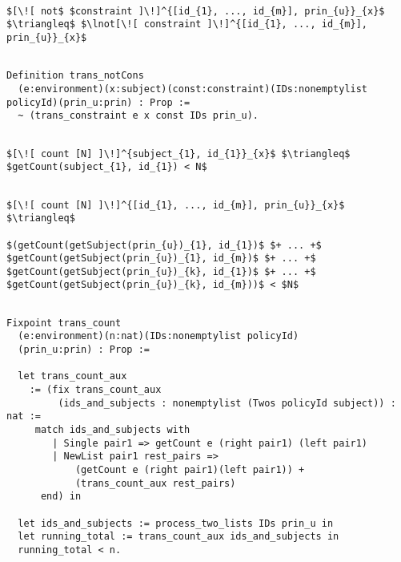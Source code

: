 \lstset{mathescape, language=AST}  
\begin{lstlisting}[frame=single, caption={Not Constraint Translation},label={lst:transnotCons}]

$[\![ not$ $constraint ]\!]^{[id_{1}, ..., id_{m}], prin_{u}}_{x}$ $\triangleq$ $\lnot[\![ constraint ]\!]^{[id_{1}, ..., id_{m}], prin_{u}}_{x}$ 

\end{lstlisting}

\begin{lstlisting}

Definition trans_notCons
  (e:environment)(x:subject)(const:constraint)(IDs:nonemptylist policyId)(prin_u:prin) : Prop :=
  ~ (trans_constraint e x const IDs prin_u).
\end{lstlisting}



\lstset{mathescape, language=AST}  
\begin{lstlisting}[frame=single, caption={Count Translation {$\colon$} subject and policyId pair},label={lst:transcountSinglePair}]

$[\![ count [N] ]\!]^{subject_{1}, id_{1}}_{x}$ $\triangleq$ $getCount(subject_{1}, id_{1}) < N$
\end{lstlisting}

\lstset{mathescape, language=AST}  
\begin{lstlisting}[frame=single, caption={Count Translation {$\colon$} subject and policyId pairs},label={lst:transcountPairs}]

$[\![ count [N] ]\!]^{[id_{1}, ..., id_{m}], prin_{u}}_{x}$ $\triangleq$ 

$(getCount(getSubject(prin_{u})_{1}, id_{1})$ $+ ... +$ $getCount(getSubject(prin_{u})_{1}, id_{m})$ $+ ... +$ $getCount(getSubject(prin_{u})_{k}, id_{1})$ $+ ... +$ $getCount(getSubject(prin_{u})_{k}, id_{m}))$ < $N$


\end{lstlisting}




\begin{lstlisting}
Fixpoint trans_count 
  (e:environment)(n:nat)(IDs:nonemptylist policyId)
  (prin_u:prin) : Prop := 

  let trans_count_aux 
    := (fix trans_count_aux
         (ids_and_subjects : nonemptylist (Twos policyId subject)) : nat :=
     match ids_and_subjects with
        | Single pair1 => getCount e (right pair1) (left pair1)
        | NewList pair1 rest_pairs =>
            (getCount e (right pair1)(left pair1)) +
            (trans_count_aux rest_pairs)
      end) in
  
  let ids_and_subjects := process_two_lists IDs prin_u in
  let running_total := trans_count_aux ids_and_subjects in
  running_total < n.
\end{lstlisting}